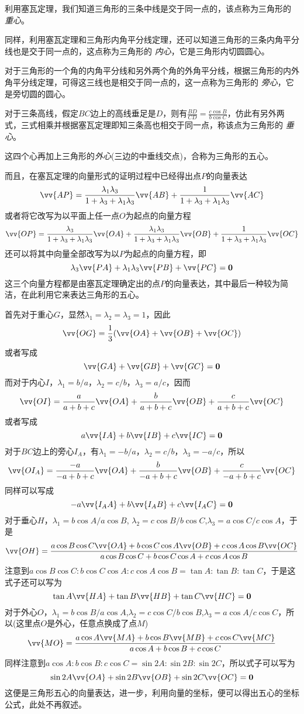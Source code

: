 \begin{example}[三角形的几个心及其向量表达]
 利用塞瓦定理，我们知道三角形的三条中线是交于同一点的，该点称为三角形的 \emph{重心}。

 同样，利用塞瓦定理和三角形内角平分线定理，还可以知道三角形的三条内角平分线也是交于同一点的，这点称为三角形的 \emph{内心}，它是三角形内切圆圆心。

 对于三角形的一个角的内角平分线和另外两个角的外角平分线，根据三角形的内外角平分线定理，可得这三线也是相交于同一点的，这一点称为三角形的 \emph{旁心}，它是旁切圆的圆心。

 对于三条高线，假定$BC$边上的高线垂足是$D$，则有$\frac{BD}{CD}=\frac{c \cos{B}}{b \cos{C}}$，仿此有另外两式，三式相乘并根据塞瓦定理即知三条高也相交于同一点，称该点为三角形的 \emph{垂心}。

这四个心再加上三角形的\emph{外心}(三边的中垂线交点)，合称为三角形的五心。 

而且，在塞瓦定理的向量形式的证明过程中已经得出点$P$的向量表达
 \[ \vv{AP} = \frac{\lambda_1\lambda_3}{1+\lambda_3+\lambda_1\lambda_3} \vv{AB} + \frac{1}{1+\lambda_3+\lambda_1\lambda_3} \vv{AC} \]
 或者将它改写为以平面上任一点$O$为起点的向量方程
 \[ \vv{OP} = \frac{\lambda_3}{1+\lambda_3+\lambda_1\lambda_3} \vv{OA} + \frac{\lambda_1\lambda_3}{1+\lambda_3+\lambda_1\lambda_3} \vv{OB} + \frac{1}{1+\lambda_3+\lambda_1\lambda_3} \vv{OC} \]
 还可以将其中向量全部改写为以$P$为起点的向量方程，即
 \[ \lambda_3 \vv{PA} + \lambda_1 \lambda_3 \vv{PB} + \vv{PC} = \bm{0} \]
 这三个向量方程都是由塞瓦定理确定出的点$P$的向量表达，其中最后一种较为简洁，在此利用它来表达三角形的五心。

 首先对于重心$G$，显然$\lambda_1=\lambda_2=\lambda_3=1$，因此
 \[ \vv{OG} = \frac{1}{3} (\vv{OA} + \vv{OB} + \vv{OC}) \]
 或者写成
 \[ \vv{GA} + \vv{GB} + \vv{GC} = \bm{0} \]
 而对于内心$I$，$\lambda_1 = b/a$，$\lambda_2=c/b$，$\lambda_3=a/c$，因而
 \[ \vv{OI} = \frac{a}{a+b+c} \vv{OA} + \frac{b}{a+b+c} \vv{OB} + \frac{c}{a+b+c} \vv{OC} \]
 或者写成
 \[ a\vv{IA} + b \vv{IB} + c\vv{IC} = \bm{0} \]
 对于$BC$边上的旁心$I_A$，有$\lambda_1=-b/a$，$\lambda_2=c/b$，$\lambda_3=-a/c$，所以
 \[ \vv{OI_A} = \frac{-a}{-a+b+c} \vv{OA} + \frac{b}{-a+b+c} \vv{OB} + \frac{c}{-a+b+c} \vv{OC} \]
 同样可以写成
 \[ -a \vv{I_AA} + b \vv{I_AB} + c\vv{I_AC} = \bm{0} \]
 对于垂心$H$，$\lambda_1=b\cos{A}/a\cos{B}$, $\lambda_2=c\cos{B}/b\cos{C}$,$\lambda_3=a\cos{C}/c\cos{A}$，于是
 \[ \vv{OH} = \frac{a \cos{B}\cos{C} \vv{OA} + b \cos{C}\cos{A} \vv{OB} + c \cos{A}\cos{B} \vv{OC}}{a\cos{B}\cos{C}+b\cos{C}\cos{A}+c\cos{A}\cos{B}} \]
 注意到$a \cos{B}\cos{C} : b \cos{C}\cos{A} : c \cos{A}\cos{B} = \tan{A} : \tan{B} : \tan{C}$，于是这式子还可以写为
 \[ \tan{A} \vv{HA} + \tan{B} \vv{HB} + \tan{C} \vv{HC} = \bm{0} \]
 对于外心$O$，$\lambda_1=b\cos{B}/a\cos{A}$,$\lambda_2=c\cos{C}/b\cos{B}$,$\lambda_3=a\cos{A}/c\cos{C}$，所以(这里点$O$是外心，任意点换成了点$M$)
 \[ \vv{MO} = \frac{a\cos{A}\vv{MA}+b\cos{B}\vv{MB}+c\cos{C}\vv{MC}}{a\cos{A}+b\cos{B}+c\cos{C}} \]
 同样注意到$a\cos{A} : b\cos{B} : c\cos{C} = \sin{2A} : \sin{2B} : \sin{2C}$，所以式子可以写为
 \[ \sin{2A} \vv{OA} + \sin{2B} \vv{OB} + \sin{2C} \vv{OC} = \bm{0} \]
 这便是三角形五心的向量表达，进一步，利用向量的坐标，便可以得出五心的坐标公式，此处不再叙述。
\end{example}

